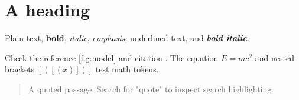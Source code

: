 \documentclass{article}
\begin{document}
\section{A heading}

{{{{{{}}}}}} %

Plain text, \textbf{bold}, \textit{italic}, \emph{emphasis},
\underline{underlined text}, and \textbf{\textit{bold italic}}.

Check the reference \ref{fig:model} and citation \cite{lucretia2026}.
The equation $E = mc^2$ and nested brackets ${[({[(x)]})]}$ test math tokens.

\begin{quote}
  A quoted passage. Search for "quote" to inspect search highlighting.
\end{quote}
\end{document}
